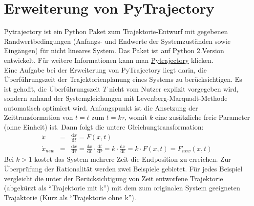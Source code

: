\section{Erweiterung von PyTrajectory}
\label{Erweiterung_von_PyTrajectory}
Pytrajectory ist ein Python Paket zum Trajektorie-Entwurf mit gegebenen Randwertbedingungen (Anfangs- und Endwerte der Systemzuständen sowie Eingängen) für nicht lineares System. Das Paket ist auf Python 2.Version entwickelt. Für weitere Informationen kann man \href{https://pytrajectory.readthedocs.io/en/master/guide/about.html}{Pytrajectory} klicken.\\
Eine Aufgabe bei der Erweiterung von PyTrajectory liegt darin, die Überführungszeit der Trajektorienplanung eines Systems zu berücksichtigen. 
Es ist gehofft, die Überführungszeit $T$ nicht vom Nutzer explizit vorgegeben wird, sondern anhand der Systemgleichungen mit Levenberg-Marquadt-Methode automatisch optimiert wird. Anfangspunkt ist die Ansetzung der Zeittransformation von $t = t$ zum $t = k\tau$, womit $k$ eine zusätzliche freie Parameter (ohne Einheit) ist. Dann folgt die untere Gleichungtransformation:
\begin{eqnarray}
\dot{x} &=& \frac{\mathrm{d} x}{\mathrm{d} t} = F\left ( x,t \right ) \label{eq:ori}\\
\dot{x}_{new} &=& \frac{\mathrm{d} x}{\mathrm{d} \tau} = \frac{\mathrm{d} x}{\mathrm{d} t}\cdot \frac{\mathrm{d} t}{\mathrm{d} \tau} = k\cdot \frac{\mathrm{d} x}{\mathrm{d} t} = k\cdot F(x,t) = F_{new}\left ( x,t \right )\label{eq:mit_k}
\end{eqnarray}
Bei $k>1$ kostet das System mehrere Zeit die Endposition zu erreichen.
Zur Überprüfung der Rationalität werden zwei Beispiele gebietet. Für jedes Beispiel vergleicht die unter der Berücksichtigung von Zeit entworfene Trajektorie (abgekürzt als ``Trajektorie mit k'') mit dem zum originalen System geeigneten Trajaktorie (Kurz als ``Trajektorie ohne k'').

